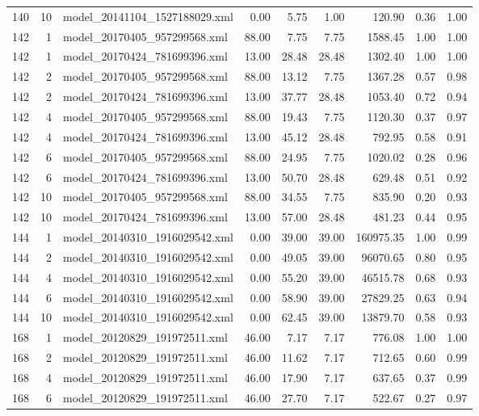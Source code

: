 \begin{table}[ht]
\begin{tabular}{rrlrrrrrr}
  140 &  10 & model\_20141104\_1527188029.xml & 0.00 & 5.75 & 1.00 & 120.90 & 0.36 & 1.00 \\ 
  142 &   1 & model\_20170405\_957299568.xml & 88.00 & 7.75 & 7.75 & 1588.45 & 1.00 & 1.00 \\ 
  142 &   1 & model\_20170424\_781699396.xml & 13.00 & 28.48 & 28.48 & 1302.40 & 1.00 & 1.00 \\ 
  142 &   2 & model\_20170405\_957299568.xml & 88.00 & 13.12 & 7.75 & 1367.28 & 0.57 & 0.98 \\ 
  142 &   2 & model\_20170424\_781699396.xml & 13.00 & 37.77 & 28.48 & 1053.40 & 0.72 & 0.94 \\ 
  142 &   4 & model\_20170405\_957299568.xml & 88.00 & 19.43 & 7.75 & 1120.30 & 0.37 & 0.97 \\ 
  142 &   4 & model\_20170424\_781699396.xml & 13.00 & 45.12 & 28.48 & 792.95 & 0.58 & 0.91 \\ 
  142 &   6 & model\_20170405\_957299568.xml & 88.00 & 24.95 & 7.75 & 1020.02 & 0.28 & 0.96 \\ 
  142 &   6 & model\_20170424\_781699396.xml & 13.00 & 50.70 & 28.48 & 629.48 & 0.51 & 0.92 \\ 
  142 &  10 & model\_20170405\_957299568.xml & 88.00 & 34.55 & 7.75 & 835.90 & 0.20 & 0.93 \\ 
  142 &  10 & model\_20170424\_781699396.xml & 13.00 & 57.00 & 28.48 & 481.23 & 0.44 & 0.95 \\ 
  144 &   1 & model\_20140310\_1916029542.xml & 0.00 & 39.00 & 39.00 & 160975.35 & 1.00 & 0.99 \\ 
  144 &   2 & model\_20140310\_1916029542.xml & 0.00 & 49.05 & 39.00 & 96070.65 & 0.80 & 0.95 \\ 
  144 &   4 & model\_20140310\_1916029542.xml & 0.00 & 55.20 & 39.00 & 46515.78 & 0.68 & 0.93 \\ 
  144 &   6 & model\_20140310\_1916029542.xml & 0.00 & 58.90 & 39.00 & 27829.25 & 0.63 & 0.94 \\ 
  144 &  10 & model\_20140310\_1916029542.xml & 0.00 & 62.45 & 39.00 & 13879.70 & 0.58 & 0.93 \\ 
  168 &   1 & model\_20120829\_191972511.xml & 46.00 & 7.17 & 7.17 & 776.08 & 1.00 & 1.00 \\ 
  168 &   2 & model\_20120829\_191972511.xml & 46.00 & 11.62 & 7.17 & 712.65 & 0.60 & 0.99 \\ 
  168 &   4 & model\_20120829\_191972511.xml & 46.00 & 17.90 & 7.17 & 637.65 & 0.37 & 0.99 \\ 
  168 &   6 & model\_20120829\_191972511.xml & 46.00 & 27.70 & 7.17 & 522.67 & 0.27 & 0.97 \\ 

\end{tabular}
\end{table}
